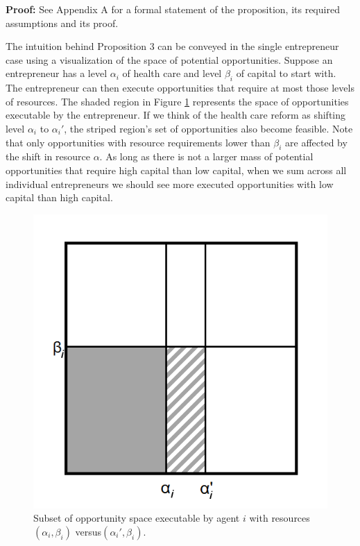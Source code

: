 \textbf{Proof:}
See Appendix A for a formal statement of the proposition, its required assumptions and its proof. 

The intuition behind Proposition 3 can be conveyed in the single entrepreneur case using a visualization of the space of potential opportunities. Suppose an entrepreneur has a level $\alpha_i$ of health care and level $\beta_i$ of capital to start with. The entrepreneur can then execute opportunities that require at most those levels of resources. The shaded region in Figure \ref{fig:ideaSpace} represents the space of opportunities executable by the entrepreneur. If we think of the health care reform as shifting level $\alpha_i$ to $\alpha_i'$, the striped region's set of opportunities also become feasible. Note that only opportunities with resource requirements lower than $\beta_i$ are affected by the shift in resource $\alpha$. As long as there is not a larger mass of potential opportunities that require high capital than low capital, when we sum across all individual entrepreneurs we should see more executed opportunities with low capital than high capital. 

\begin{figure}[h]
	\centering
	\includegraphics[scale=0.5]{resources/Prop1}
	\caption{Subset of opportunity space executable by agent $i$ with resources $(\alpha_i,\beta_i)$ versus$(\alpha_i', \beta_i)$.}
	\label{fig:ideaSpace}
\end{figure}

